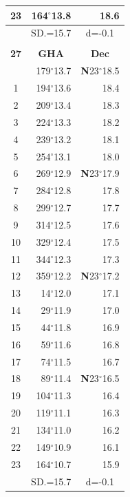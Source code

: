 \documentclass[10pt, a4paper]{report}
\begin{document}
\begin{scriptsize}
\begin{tabular*}{0.2\textwidth}[t]{@{\extracolsep{\fill}}|c|rr|}
23 & 164$^\circ$13.8 & 18.6\\
\hline
\rule{0pt}{2.4ex} & \multicolumn{1}{c}{SD.=15.7} & \multicolumn{1}{c|}{d=-0.1}\\
\hline
\multicolumn{1}{c}{}\\[-0.5ex]\hline
\multicolumn{1}{|c|}{\rule{0pt}{2.6ex}\textbf{27}} & \multicolumn{1}{c}{\textbf{GHA}} & \multicolumn{1}{c|}{\textbf{Dec}}\\
\hline\rule{0pt}{2.6ex}\noindent
0 & 179$^\circ$13.7 & \textbf{N}23$^\circ$18.5\\
1 & 194$^\circ$13.6 & 18.4\\
2 & 209$^\circ$13.4 & 18.3\\
3 & 224$^\circ$13.3 & \raisebox{0.24ex}{\boldmath$\cdot$~\boldmath$\cdot$~~}18.2\\
4 & 239$^\circ$13.2 & 18.1\\
5 & 254$^\circ$13.1 & 18.0\\[2Pt]
6 & 269$^\circ$12.9 & \textbf{N}23$^\circ$17.9\\
7 & 284$^\circ$12.8 & 17.8\\
8 & 299$^\circ$12.7 & 17.7\\
9 & 314$^\circ$12.5 & \raisebox{0.24ex}{\boldmath$\cdot$~\boldmath$\cdot$~~}17.6\\
10 & 329$^\circ$12.4 & 17.5\\
11 & 344$^\circ$12.3 & 17.3\\[2Pt]
12 & 359$^\circ$12.2 & \textbf{N}23$^\circ$17.2\\
13 & 14$^\circ$12.0 & 17.1\\
14 & 29$^\circ$11.9 & 17.0\\
15 & 44$^\circ$11.8 & \raisebox{0.24ex}{\boldmath$\cdot$~\boldmath$\cdot$~~}16.9\\
16 & 59$^\circ$11.6 & 16.8\\
17 & 74$^\circ$11.5 & 16.7\\[2Pt]
18 & 89$^\circ$11.4 & \textbf{N}23$^\circ$16.5\\
19 & 104$^\circ$11.3 & 16.4\\
20 & 119$^\circ$11.1 & 16.3\\
21 & 134$^\circ$11.0 & \raisebox{0.24ex}{\boldmath$\cdot$~\boldmath$\cdot$~~}16.2\\
22 & 149$^\circ$10.9 & 16.1\\
23 & 164$^\circ$10.7 & 15.9\\
\hline
\rule{0pt}{2.4ex} & \multicolumn{1}{c}{SD.=15.7} & \multicolumn{1}{c|}{d=-0.1}\\
\hline
\end{tabular*}\noindent

\end{scriptsize}
\end{document}
